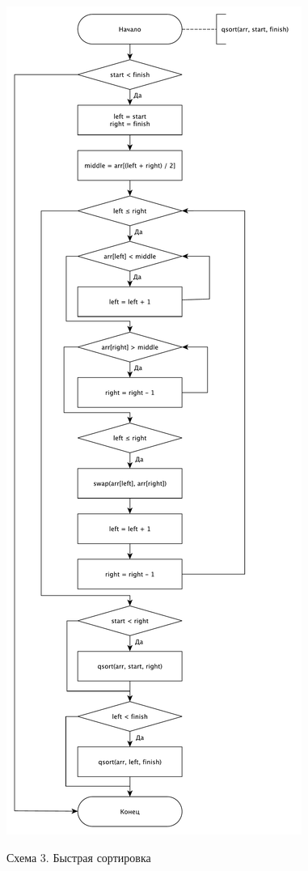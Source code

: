 \documentclass[a4paper,12pt]{article}
\begin{document}
\begin{center}
    \includegraphics[scale=0.45]{QSort}

    Схема 3. Быстрая сортировка
\end{center}
\end{document}
